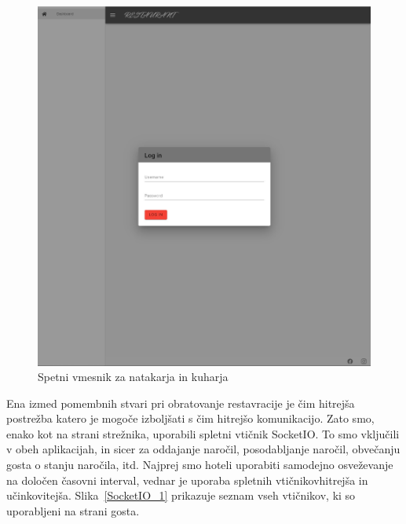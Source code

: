 \documentclass[a4paper, 12pt]{book}
\begin{document}
\begin{figure}[!htb]
\begin{center}
\includegraphics[width=12cm]{natakar-gost_1.jpg}
\caption{Spetni vmesnik za natakarja in kuharja}
\label{NatakarGost}
\end{center}
\end{figure}

Ena izmed pomembnih stvari pri obratovanje restavracije je čim hitrejša postrežba katero je mogoče izboljšati s čim hitrejšo komunikacijo. Zato smo, enako kot na strani strežnika, uporabili spletni vtičnik SocketIO. To smo vključili v obeh aplikacijah, in sicer za oddajanje naročil, posodabljanje naročil, obvečanju gosta o stanju naročila, itd. Najprej smo hoteli uporabiti samodejno osveževanje na določen časovni interval, vednar je uporaba spletnih vtičnikovhitrejša in učinkovitejša. Slika~\ref{SocketIO_1} prikazuje seznam vseh vtičnikov, ki so uporabljeni na strani gosta.
\end{document}
